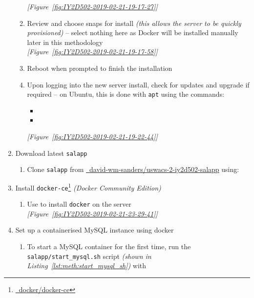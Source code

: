 \begin{enumerate}[leftmargin=0em,label=\protect\listlabelcircle{\arabic*}]
\begin{enumerate}[label=\roman*~\textcolor{light-gray}{|}]
      \textcolor{deep-gray}{\textit{[Figure~\ref{fig:IY2D502-2019-02-21-19-17-27}]}}
      \item Review and choose snaps for install \textit{(this allows the server to be quickly provisioned)} -- select nothing here as Docker will be installed manually later in this methodology\\
      \textcolor{deep-gray}{\textit{[Figure~\ref{fig:IY2D502-2019-02-21-19-17-58}]}}
      \item Reboot when prompted to finish the installation
      \item Upon logging into the new server install, check for updates and upgrade if required -- on Ubuntu, this is done with \texttt{apt} using the commands:
        \begin{itemize}
          \item {}
          \item {}
        \end{itemize}
      \textcolor{deep-gray}{\textit{[Figure~\ref{fig:IY2D502-2019-02-21-19-22-44}]}}
    \end{enumerate}
  \item Download latest \texttt{salapp}
    \begin{enumerate}[label=\roman*~\textcolor{light-gray}{|}]
      \item Clone \texttt{salapp} from \href{https://github.com/david-wm-sanders/uswacs-2-iy2d502-salapp}{\faGithub\ david-wm-sanders/uswacs-2-iy2d502-salapp} using:\\
    \end{enumerate}
  \item Install \texttt{docker-ce}\footnote{\href{https://github.com/docker/docker-ce}{\faGithub\ docker/docker-ce}} \textit{(Docker Community Edition)}
    \begin{enumerate}[label=\roman*~\textcolor{light-gray}{|}]
      \item Use  to install \texttt{docker} on the server\\
      \textcolor{deep-gray}{\textit{[Figure~\ref{fig:IY2D502-2019-02-21-23-29-41}]}}
    \end{enumerate}
  \item Set up a containerised MySQL instance using docker
    \begin{enumerate}[label=\roman*~\textcolor{light-gray}{|}]
      \item To start a MySQL container for the first time, run the \texttt{salapp/start\_mysql.sh} script \textit{(shown in Listing~\ref{lst:meth:start_mysql_sh})} with \\

\end{enumerate}
\end{enumerate}
